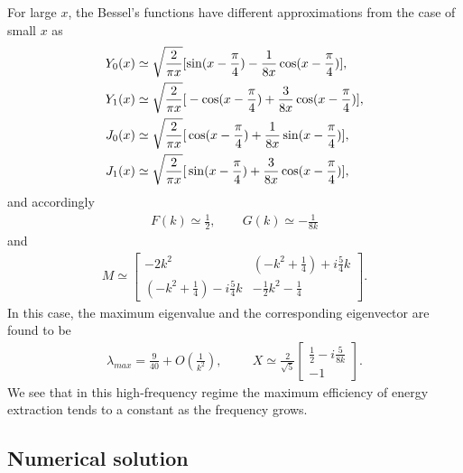 For large $x$, the Bessel's functions have different approximations from the case of small $x$ as
\begin{align}
Y_0(x) & \simeq  \sqrt{\frac{2}{\pi x}} [ \sin (x-\frac{\pi}{4}) - \frac{1}{8x} \cos (x - \frac{\pi}{4}) ], \\
Y_1(x) & \simeq  \sqrt{\frac{2}{\pi x}} \large{[} -\cos (x-\frac{\pi}{4})+\frac{3}{8x} \cos (x - \frac{\pi}{4}) \large{]}, \\
J_0(x) & \simeq  \sqrt{\frac{2}{\pi x}} \large{[} \cos (x-\frac{\pi}{4}) + \frac{1}{8x} \sin (x - \frac{\pi}{4}) \large{]}, \\
J_1(x) & \simeq  \sqrt{\frac{2}{\pi x}} \large{[} \sin (x-\frac{\pi}{4}) + \frac{3}{8x} \cos (x - \frac{\pi}{4}) \large{]},
\end{align}
and accordingly
\begin{align}
F(k) \simeq \frac{1}{2},   \hspace{25pt}  G(k) \simeq -\frac{1}{8k}
\end{align}
and
\begin{align}
M \simeq \begin{bmatrix}   -2k^2   &  (-k^2+\frac{1}{4}) + i\frac{5}{4}k  \\
                        (-k^2+\frac{1}{4}) - i\frac{5}{4}k &   -\frac{1}{2}k^2-\frac{1}{4}  \end{bmatrix}.
\end{align}
In this case, the maximum eigenvalue and the corresponding eigenvector are found to be
\begin{align}
\lambda_{max} = \frac{9}{40} + O(\frac{1}{k^2}), \hspace{1cm}
X \simeq \frac{2}{\sqrt{5}}
\begin{bmatrix} \frac{1}{2} - i \frac{5}{8k}   \\     -1     \end{bmatrix}.
\end{align}
We see that in this high-frequency regime the maximum efficiency of energy extraction tends to a constant as the frequency grows.

\subsection{Numerical solution}

